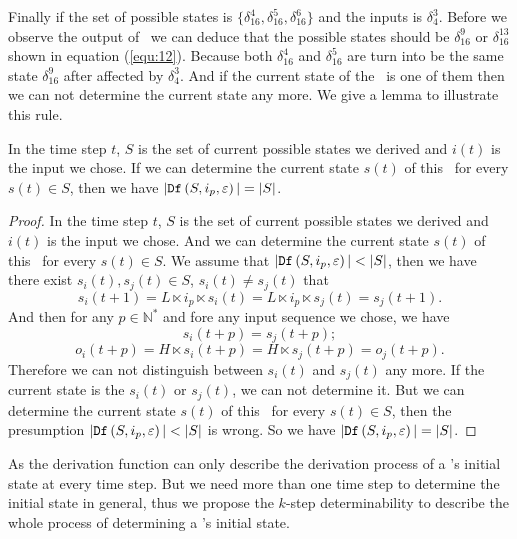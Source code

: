  Finally if the set of possible states is $\{\delta_{16}^4,\delta_{16}^5,\delta_{16}^6\}$ and the inputs is $\delta_4^3$. Before we observe the output of \BCN\ we can deduce that the possible states should be $\delta_{16}^9$ or $\delta_{16}^{13}$ shown in equation (\ref{equ:12}). Because both $\delta_{16}^4$ and $\delta_{16}^5$ are turn into be the same state $\delta_{16}^9$ after affected by $\delta_4^3$. And if the current state of the \BCN\ is one of them then we can not determine the current state any more. We give a lemma to illustrate this rule.
\begin{lemma}
 In the time step $t$, $S$ is the set of current possible states we derived and $i(t)$ is the input we chose. If we can determine the current state $s(t)$ of this \BCN\ for every $s(t)\in S$, then we have 
 $|{\tt Df}\left(S,i_p,\varepsilon\right)|=|S|$.
 \label{lemm:1}
\end{lemma}

\begin{proof}
In the time step $t$, $S$ is the set of current possible states we derived and $i(t)$ is the input we chose. And we can determine the current state $s(t)$ of this \BCN\ for every $s(t)\in S$. We assume that $|\Ded\left(S,i_p,\varepsilon\right)|<|S|$, then we have there exist $s_i(t), s_j(t)\in S$, $s_i(t)\neq s_j(t)$ that 
\[s_i(t+1)=L\ltimes i_p\ltimes s_i(t)=L\ltimes i_p\ltimes s_j(t)=s_j(t+1).\]
And then for any $p\in \mathbb{N}^*$ and fore any input sequence we chose, we have 
\[s_i(t+p)=s_j(t+p);\]
\[o_i(t+p)= H\ltimes{s_i(t+p)}= H\ltimes{s_j(t+p)}=o_j(t+p).\]
 Therefore we can not distinguish between $s_i(t)$ and $s_j(t)$ any more.
 If the current state is the $s_i(t)$ or $s_j(t)$, we can not determine it. But we can determine the current state $s(t)$ of this \BCN\ for every $s(t)\in S$, then the presumption $|\Ded\left(S,i_p,\varepsilon\right)|<|S|$ is wrong. So we have $|{\tt Df}\left(S,i_p,\varepsilon\right)|=|S|$.
\end{proof}
 

As the derivation function can only describe the derivation process of a \BCN's initial state at every time step. But we need more than one time step to determine the initial state in general, thus we propose the $k$-step determinability to describe the whole process of determining a \BCN's initial state.
